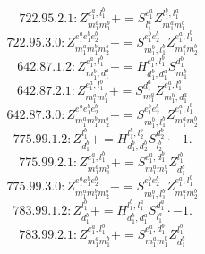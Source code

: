 \documentclass[letterpaper,10pt,fleqn,leqno,onecolumn]{article}
\begin{document}
\begin{equation} \;\;\;\;\;\;  722.95.2.1: Z^{e_{1}^{a},l_{1}^{b}}_{m_{1}^{a}m_{1}^{b}}+=S^{e_{1}^{a}}_{l_{1}^{a}}Z^{l_{1}^{b},l_{1}^{a}}_{m_{1}^{a}m_{1}^{b}} \end{equation}
\begin{equation} \;\;\;\;\;\;  722.95.3.0: Z^{e_{1}^{a}e_{1}^{b}e_{2}^{b}}_{m_{1}^{a}m_{1}^{b}m_{2}^{b}}+=S^{e_{1}^{b}e_{2}^{b}}_{m_{1}^{b},l_{1}^{b}}Z^{e_{1}^{a},l_{1}^{b}}_{m_{1}^{a}m_{2}^{b}} \end{equation}
\begin{equation} \;\;\;\;\;\;  642.87.1.2: Z^{e_{1}^{a},l_{1}^{b}}_{m_{1}^{b},d_{1}^{a}}+=H^{e_{1}^{a},l_{1}^{b}}_{d_{1}^{b},d_{1}^{a}}S^{d_{1}^{b}}_{m_{1}^{b}} \end{equation}
\begin{equation} \;\;\;\;\;\;  642.87.2.1: Z^{e_{1}^{a},l_{1}^{b}}_{m_{1}^{a}m_{1}^{b}}+=S^{d_{1}^{a}}_{m_{1}^{a}}Z^{e_{1}^{a},l_{1}^{b}}_{m_{1}^{b},d_{1}^{a}} \end{equation}
\begin{equation} \;\;\;\;\;\;  642.87.3.0: Z^{e_{1}^{a}e_{1}^{b}e_{2}^{b}}_{m_{1}^{a}m_{1}^{b}m_{2}^{b}}+=S^{e_{1}^{b}e_{2}^{b}}_{m_{1}^{b},l_{1}^{b}}Z^{e_{1}^{a},l_{1}^{b}}_{m_{1}^{a}m_{2}^{b}} \end{equation}
\begin{equation} \;\;\;\;\;\;  775.99.1.2: Z^{l_{1}^{b}}_{d_{1}^{b}}+=H^{l_{1}^{b},l_{2}^{b}}_{d_{1}^{b},d_{2}^{b}}S^{d_{2}^{b}}_{l_{2}^{b}}\cdot -1. \end{equation}
\begin{equation} \;\;\;\;\;\;  775.99.2.1: Z^{e_{1}^{a},l_{1}^{b}}_{m_{1}^{a}m_{1}^{b}}+=S^{e_{1}^{a},d_{1}^{b}}_{m_{1}^{a}m_{1}^{b}}Z^{l_{1}^{b}}_{d_{1}^{b}} \end{equation}
\begin{equation} \;\;\;\;\;\;  775.99.3.0: Z^{e_{1}^{a}e_{1}^{b}e_{2}^{b}}_{m_{1}^{a}m_{1}^{b}m_{2}^{b}}+=S^{e_{1}^{b}e_{2}^{b}}_{m_{1}^{b},l_{1}^{b}}Z^{e_{1}^{a},l_{1}^{b}}_{m_{1}^{a}m_{2}^{b}} \end{equation}
\begin{equation} \;\;\;\;\;\;  783.99.1.2: Z^{l_{1}^{b}}_{d_{1}^{b}}+=H^{l_{1}^{b},l_{1}^{a}}_{d_{1}^{b},d_{1}^{a}}S^{d_{1}^{a}}_{l_{1}^{a}}\cdot -1. \end{equation}
\begin{equation} \;\;\;\;\;\;  783.99.2.1: Z^{e_{1}^{a},l_{1}^{b}}_{m_{1}^{a}m_{1}^{b}}+=S^{e_{1}^{a},d_{1}^{b}}_{m_{1}^{a}m_{1}^{b}}Z^{l_{1}^{b}}_{d_{1}^{b}} \end{equation}
\end{document}
